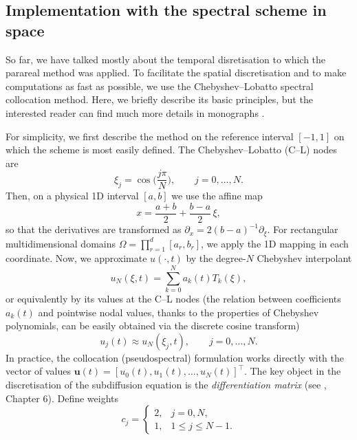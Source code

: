\documentclass[12pt,a4paper]{article}
\begin{document}
\subsection{Implementation with the spectral scheme in space}

So far, we have talked mostly about the temporal disretisation to which the parareal method was applied. To facilitate the spatial discretisation and to make computations as fast as possible, we use the Chebyshev--Lobatto spectral collocation method. Here, we briefly describe its basic principles, but the interested reader can find much more details in monographs \cite{canuto2006spectral, trefethen2000spectral}. 

For simplicity, we first describe the method on the reference interval \([-1,1]\) on which the scheme is most easily defined. The Chebyshev--Lobatto (C--L) nodes are
\begin{equation}
	\xi_j = \cos\!\bigg(\frac{j\pi}{N}\bigg),\qquad j=0,\dots,N.
\end{equation}
Then, on a physical 1D interval \([a,b]\) we use the affine map
\begin{equation}
	x = \frac{a+b}{2} + \frac{b-a}{2}\,\xi,
\end{equation}
so that the derivatives are transformed as \(\partial_x = 2(b-a)^{-1}\partial_\xi\). For rectangular multidimensional domains \(\Omega = \prod_{r=1}^d [a_r,b_r]\), we apply the 1D mapping in each coordinate. Now, we approximate \(u(\cdot,t)\) by the degree-$N$ Chebyshev interpolant
\begin{equation}
	u_N(\xi,t) = \sum_{k=0}^N a_k(t) T_k(\xi),
\end{equation}
or equivalently by its values at the C--L nodes (the relation between coefficients $a_k(t)$ and pointwise nodal values, thanks to the properties of Chebyshev polynomials, can be easily obtained via the discrete cosine transform)
\begin{equation}
	u_{j}(t) \approx u_N(\xi_j,t),\qquad j=0,\dots,N.
\end{equation}
In practice, the collocation (pseudospectral) formulation works directly with the vector of values \(\mathbf{u}(t) = [u_0(t),u_1(t),\dots,u_N(t)]^\top\). The key object in the discretisation of the subdiffusion equation is the \textit{differentiation matrix} (see \cite{trefethen2000spectral}, Chapter 6). Define weights
\begin{equation}
	c_j=\begin{cases} 2,& j=0,N,\\ 1,& 1\le j\le N-1. \end{cases}
\end{equation}
\end{document}
